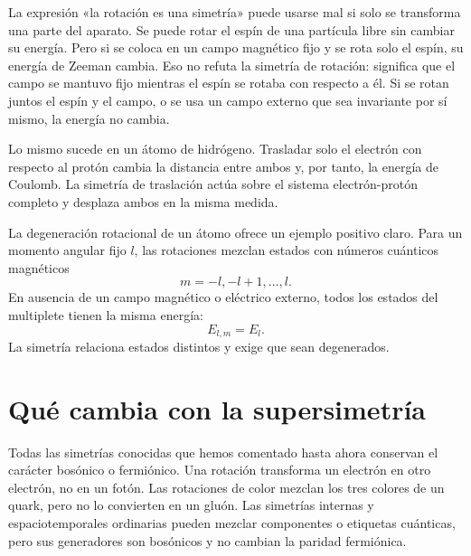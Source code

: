 La expresión «la rotación es una simetría» puede usarse mal si solo se transforma una parte del aparato. Se puede rotar el espín de una partícula libre sin cambiar su energía. Pero si se coloca en un campo magnético fijo y se rota solo el espín, su energía de Zeeman cambia. Eso no refuta la simetría de rotación: significa que el campo se mantuvo fijo mientras el espín se rotaba con respecto a él. Si se rotan juntos el espín y el campo, o se usa un campo externo que sea invariante por sí mismo, la energía no cambia.

Lo mismo sucede en un átomo de hidrógeno. Trasladar solo el electrón con respecto al protón cambia la distancia entre ambos y, por tanto, la energía de Coulomb. La simetría de traslación actúa sobre el sistema electrón-protón completo y desplaza ambos en la misma medida.

\begin{classroomqa}
\end{classroomqa}

La degeneración rotacional de un átomo ofrece un ejemplo positivo claro. Para un momento angular fijo \(l\), las rotaciones mezclan estados con números cuánticos magnéticos
\begin{equation}
m=-l,-l+1,\ldots,l.
\end{equation}
En ausencia de un campo magnético o eléctrico externo, todos los estados del multiplete tienen la misma energía:
\begin{equation}
E_{l,m}=E_l.
\end{equation}
La simetría relaciona estados distintos y exige que sean degenerados.

\section{Qué cambia con la supersimetría}

Todas las simetrías conocidas que hemos comentado hasta ahora conservan el carácter bosónico o fermiónico. Una rotación transforma un electrón en otro electrón, no en un fotón. Las rotaciones de color mezclan los tres colores de un quark, pero no lo convierten en un gluón. Las simetrías internas y espaciotemporales ordinarias pueden mezclar componentes o etiquetas cuánticas, pero sus generadores son bosónicos y no cambian la paridad fermiónica.

